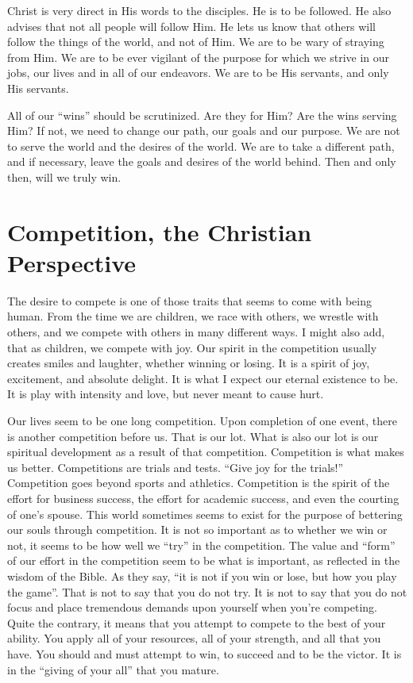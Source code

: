 \documentclass[12pt]{memoir}
\begin{document}
Christ is very direct in His words to the disciples. He is to be followed.
He also advises that not all people will follow Him. He lets us know
that others will follow the things of the world, and not of Him. We
are to be wary of straying from Him. We are to be ever vigilant of
the purpose for which we strive in our jobs, our lives and in all
of our endeavors. We are to be His servants, and only His servants.

All of our ``wins'' should be scrutinized. Are they for Him? Are
the wins serving Him? If not, we need to change our path, our goals
and our purpose. We are not to serve the world and the desires of
the world. We are to take a different path, and if necessary, leave
the goals and desires of the world behind. Then and only then, will
we truly win. 

\chapter{Competition, the Christian Perspective}

The desire to compete is one of those traits that seems to come with
being human. From the time we are children, we race with others, we
wrestle with others, and we compete with others in many different
ways. I might also add, that as children, we compete with joy. Our
spirit in the competition usually creates smiles and laughter, whether
winning or losing. It is a spirit of joy, excitement, and absolute
delight. It is what I expect our eternal existence to be. It is play
with intensity and love, but never meant to cause hurt.

Our lives seem to be one long competition. Upon completion of one
event, there is another competition before us. That is our lot. What
is also our lot is our spiritual development as a result of that competition.
Competition is what makes us better. Competitions are trials and tests.
``Give joy for the trials!'' Competition goes beyond sports and
athletics. Competition is the spirit of the effort for business success,
the effort for academic success, and even the courting of one's spouse.
This world sometimes seems to exist for the purpose of bettering our
souls through competition. It is not so important as to whether we
win or not, it seems to be how well we ``try'' in the competition.
The value and ``form'' of our effort in the competition seem to
be what is important, as reflected in the wisdom of the Bible. As
they say, ``it is not if you win or lose, but how you play the game''.
That is not to say that you do not try. It is not to say that you
do not focus and place tremendous demands upon yourself when you're
competing. Quite the contrary, it means that you attempt to compete
to the best of your ability. You apply all of your resources, all
of your strength, and all that you have. You should and must attempt
to win, to succeed and to be the victor. It is in the ``giving of
your all'' that you mature.
\end{document}
